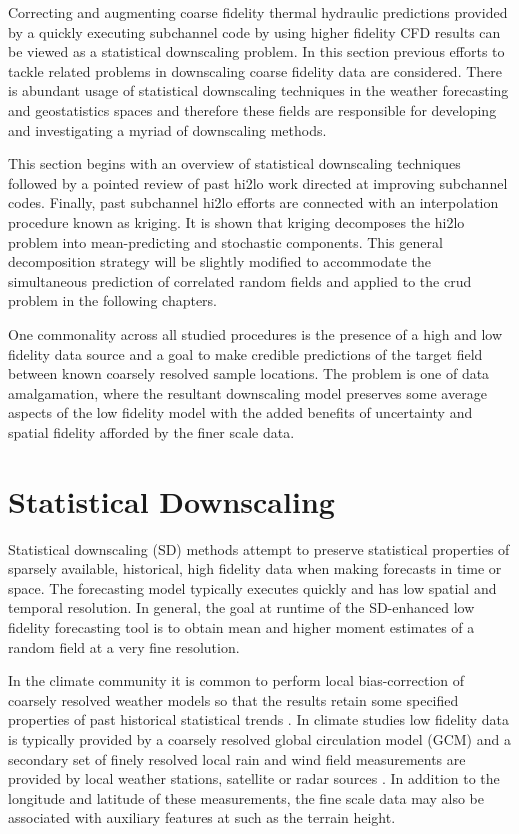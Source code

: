 
Correcting and augmenting coarse fidelity thermal hydraulic predictions provided by a quickly executing subchannel code by using higher fidelity CFD results can be viewed as a statistical downscaling problem.  In this section previous efforts to tackle related problems in downscaling coarse fidelity data are considered. There is abundant usage of statistical downscaling techniques in the weather forecasting and geostatistics spaces and therefore these fields are responsible for developing and investigating a myriad of downscaling methods.  

This section begins with an overview of statistical downscaling techniques followed by a pointed review of past hi2lo work directed at improving subchannel codes.  Finally, past subchannel hi2lo efforts are connected with an interpolation procedure known as kriging.  It is shown that kriging decomposes the hi2lo problem into mean-predicting and stochastic components.  This general decomposition strategy will be slightly modified to accommodate the simultaneous prediction of correlated random fields and applied to the crud problem in the following chapters.

One commonality across all studied procedures is the presence of a high and low fidelity data source and a goal to make credible predictions of the target field between known coarsely resolved sample locations.  The problem is one of data amalgamation, where the resultant downscaling model preserves some average aspects of the low fidelity model with the added benefits of uncertainty and spatial fidelity afforded by the finer scale data.

\section{Statistical Downscaling}

Statistical downscaling (SD) methods attempt to preserve statistical properties of sparsely available, historical, high fidelity data when making forecasts in time or space. The forecasting model typically executes quickly and has low spatial and temporal resolution.  In general, the goal at runtime of the SD-enhanced low fidelity forecasting tool is to obtain mean and higher moment estimates of a random field at a very fine resolution.

In the climate community it is common to perform local bias-correction of coarsely resolved weather models so that the results retain some specified properties of past historical statistical trends \cite{wilby1998} \cite{arelia2016}.  In climate studies low fidelity data is typically provided by a coarsely resolved global circulation model (GCM) and a secondary set of finely resolved local rain and wind field measurements are provided by local weather stations, satellite or radar sources \cite{goly2014}.  In addition to the longitude and latitude of these measurements, the fine scale data may also be associated with auxiliary features at such as the terrain height.

